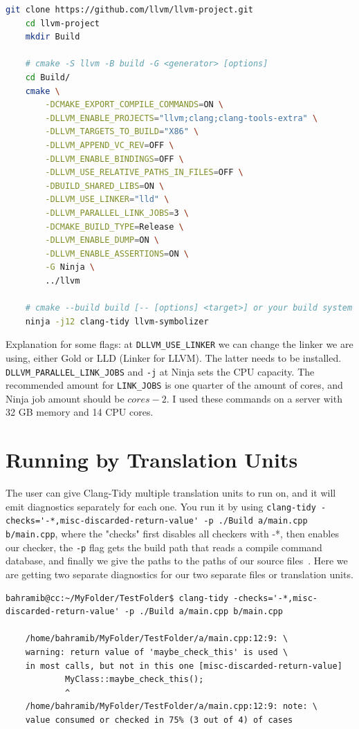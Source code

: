 \begin{lstlisting}[language={bash}]
	git clone https://github.com/llvm/llvm-project.git
	cd llvm-project
	mkdir Build

	# cmake -S llvm -B build -G <generator> [options]
	cd Build/
	cmake \
		-DCMAKE_EXPORT_COMPILE_COMMANDS=ON \
		-DLLVM_ENABLE_PROJECTS="llvm;clang;clang-tools-extra" \
		-DLLVM_TARGETS_TO_BUILD="X86" \
		-DLLVM_APPEND_VC_REV=OFF \
		-DLLVM_ENABLE_BINDINGS=OFF \
		-DLLVM_USE_RELATIVE_PATHS_IN_FILES=OFF \
		-DBUILD_SHARED_LIBS=ON \
		-DLLVM_USE_LINKER="lld" \
		-DLLVM_PARALLEL_LINK_JOBS=3 \
		-DCMAKE_BUILD_TYPE=Release \
		-DLLVM_ENABLE_DUMP=ON \
		-DLLVM_ENABLE_ASSERTIONS=ON \
		-G Ninja \
		../llvm
	
	# cmake --build build [-- [options] <target>] or your build system specified above directly.
	ninja -j12 clang-tidy llvm-symbolizer
\end{lstlisting}

Explanation for some flags: at \texttt{DLLVM\_USE\_LINKER} we can change the linker we are using, either Gold or LLD (Linker for LLVM). The
latter needs to be installed. \texttt{DLLVM\_PARALLEL\_LINK\_JOBS} and \texttt{-j} at Ninja sets the CPU capacity. The recommended amount for
\texttt{LINK\_JOBS} is one quarter of the amount of cores, and Ninja job amount should be $cores - 2$. I used these commands on a
server with 32 GB memory and 14 CPU cores.


\section{Running by Translation Units}
\label{by-TU}

The user can give Clang-Tidy multiple translation units to run on, and it will emit diagnostics separately for each one. You run it by
using \lstinline{clang-tidy -checks='-*,misc-discarded-return-value' -p ./Build a/main.cpp b/main.cpp},
where the "checks" first disables all checkers with -*, then enables our checker, the \texttt{-p} flag gets the build path that reads a
compile command database, and finally we give the paths to the paths of our source files~\cite{flags}. Here we are getting two separate diagnostics
for our two separate files or translation units.

\begin{lstlisting}[caption={Diagnostic output without project-level knowledge.},captionpos=b]
	bahramib@cc:~/MyFolder/TestFolder$ clang-tidy -checks='-*,misc-discarded-return-value' -p ./Build a/main.cpp b/main.cpp

	/home/bahramib/MyFolder/TestFolder/a/main.cpp:12:9: \
	warning: return value of 'maybe_check_this' is used \
	in most calls, but not in this one [misc-discarded-return-value]
			MyClass::maybe_check_this();
			^
	/home/bahramib/MyFolder/TestFolder/a/main.cpp:12:9: note: \
	value consumed or checked in 75% (3 out of 4) of cases
\end{lstlisting}



